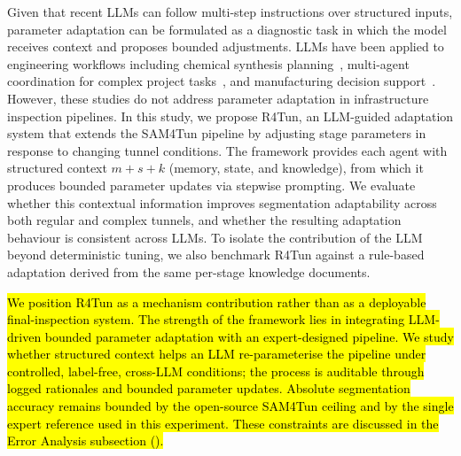 \documentclass[a4paper,fleqn]{cas-dc}
\begin{document}
{Given that recent LLMs can follow multi-step instructions over structured inputs, parameter adaptation can be formulated as a diagnostic task in which the model receives context and proposes bounded adjustments. LLMs have been applied to engineering workflows including chemical synthesis planning~\citep{bran2024chemcrow}, multi-agent coordination for complex project tasks~\citep{qian2024chatdev, hong2024metagpt, chen2024comm}, and manufacturing decision support~\citep{garcia2024manufacturing}. However, these studies do not address parameter adaptation in infrastructure inspection pipelines. In this study, we propose R4Tun, an LLM-guided adaptation system that extends the SAM4Tun pipeline by adjusting stage parameters in response to changing tunnel conditions. The framework provides each agent with structured context $m+s+k$ (memory, state, and knowledge), from which it produces bounded parameter updates via stepwise prompting. We evaluate whether this contextual information improves segmentation adaptability across both regular and complex tunnels, and whether the resulting adaptation behaviour is consistent across LLMs. To isolate the contribution of the LLM beyond deterministic tuning, we also benchmark R4Tun against a rule-based adaptation derived from the same per-stage knowledge documents.

\hl{We position R4Tun as a mechanism contribution rather than as a deployable final-inspection system. The strength of the framework lies in integrating LLM-driven bounded parameter adaptation with an expert-designed pipeline. We study whether structured context helps an LLM re-parameterise the pipeline under controlled, label-free, cross-LLM conditions; the process is auditable through logged rationales and bounded parameter updates. Absolute segmentation accuracy remains bounded by the open-source SAM4Tun ceiling and by the single expert reference used in this experiment. These constraints are discussed in the Error Analysis subsection ().}

}
\end{document}
